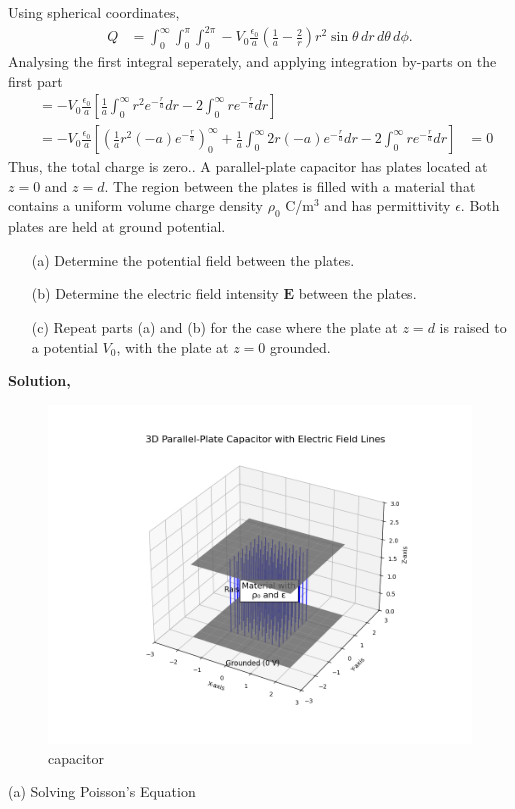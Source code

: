\documentclass{article}
\begin{document}
Using spherical coordinates,
\begin{align*}
Q &= \int_{0}^{\infty} \int_{0}^{\pi} \int_{0}^{2\pi} -V_0 \frac{\epsilon_0}{a} 
\left( \frac{1}{a} - \frac{2}{r} \right) r^2 \sin\theta \, dr \, d\theta \, d\phi.
\end{align*}
Analysing the first integral seperately, and applying integration by-parts on the first part
\begin{align*}
&= -V_0 \frac{\epsilon_0}{a} 
\left[ 
    \frac{1}{a}\int_{0}^{\infty} r^2 e^{-\frac{r}{a}} dr 
    - 
    2\int_{0}^{\infty} r e^{-\frac{r}{a}} dr
\right] \\
&= -V_0 \frac{\epsilon_0}{a} 
\left[ \left( \frac{1}{a}r^2(-a) e^{-\frac{r}{a}}\right)_0^{\infty} +
    \frac{1}{a}\int_{0}^{\infty} 2r(-a) e^{-\frac{r}{a}} dr 
    - 
    2\int_{0}^{\infty} r e^{-\frac{r}{a}} dr
\right] 
&= 0
\end{align*}
Thus, the total charge is zero.\newline {}. A parallel-plate capacitor has plates located at $z = 0$ and $z = d$. The region between the plates is filled with a material that contains a uniform volume charge density $\rho_0$ C/m$^3$ and has permittivity $\epsilon$. Both plates are held at ground potential.
\begin{enumerate}
    \item[(a)] Determine the potential field between the plates.
    \item[(b)] Determine the electric field intensity $\mathbf{E}$ between the plates.
    \item[(c)] Repeat parts (a) and (b) for the case where the plate at $z = d$ is raised to a potential $V_0$, with the plate at $z = 0$ grounded.
\end{enumerate}
\textbf{Solution,}\newline
\begin{figure}[h!]
   \centering
   \includegraphics[width=1\columnwidth]{figs/q5.png}
    \caption{capacitor}
   \label{label}
\end{figure}(a) Solving Poisson's Equation
\end{document}
